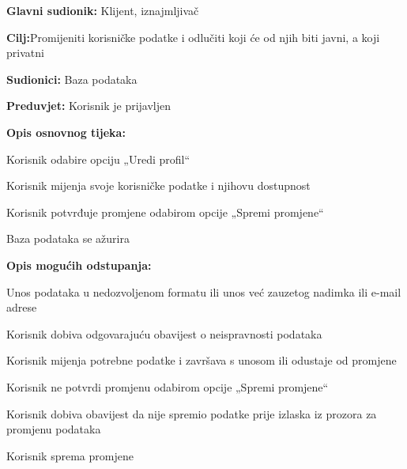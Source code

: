 						\begin{packed_item}
							
							\item \textbf{Glavni sudionik: }Klijent, iznajmljivač
							\item  \textbf{Cilj:}Promijeniti korisničke podatke i odlučiti koji će od njih biti javni, a koji privatni
							\item  \textbf{Sudionici:} Baza podataka
							\item  \textbf{Preduvjet:} Korisnik je prijavljen
							\item  \textbf{Opis osnovnog tijeka:}
							
							\item[] \begin{packed_enum}
								
								\item Korisnik odabire opciju „Uredi profil“  
								\item Korisnik mijenja svoje korisničke podatke i njihovu dostupnost 
								\item Korisnik potvrđuje promjene odabirom opcije „Spremi promjene“ 
								\item Baza podataka se ažurira 
								
								
							\end{packed_enum}
							
							\item  \textbf{Opis mogućih odstupanja:}
							
							\item[] \begin{packed_item}
								
								\item[2.a] Unos podataka u nedozvoljenom formatu ili unos već zauzetog nadimka ili e-mail adrese 
								\item[] \begin{packed_enum}
									
									\item Korisnik dobiva odgovarajuću obavijest o neispravnosti podataka 
									\item Korisnik mijenja potrebne podatke i završava s unosom ili odustaje od promjene 
									
								\end{packed_enum}
								\item[3.a] Korisnik ne potvrdi promjenu odabirom opcije „Spremi promjene“    
								\item[] \begin{packed_enum}
									
									\item Korisnik dobiva obavijest da nije spremio podatke prije izlaska iz prozora za promjenu podataka   
									\item Korisnik sprema promjene 
									
								\end{packed_enum}
								
								
								
							\end{packed_item}
						\end{packed_item}
								

